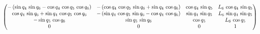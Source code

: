 $$\ifx\endpmatrix\undefined\pmatrix{\else\begin{pmatrix}\fi -\left(
 \sin q_{4}\,\sin q_{6}-\cos q_{4}\,\cos q_{5}\,\cos q_{6}\right)&-
 \left(\cos q_{4}\,\cos q_{5}\,\sin q_{6}+\sin q_{4}\,\cos q_{6}
 \right)&\cos q_{4}\,\sin q_{5}&L_{6}\,\cos q_{4}\,\sin q_{5}\cr 
 \cos q_{4}\,\sin q_{6}+\sin q_{4}\,\cos q_{5}\,\cos q_{6}&-\left(
 \sin q_{4}\,\cos q_{5}\,\sin q_{6}-\cos q_{4}\,\cos q_{6}\right)&
 \sin q_{4}\,\sin q_{5}&L_{6}\,\sin q_{4}\,\sin q_{5}\cr -\sin q_{5}
 \,\cos q_{6}&\sin q_{5}\,\sin q_{6}&\cos q_{5}&L_{6}\,\cos q_{5}\cr 
 0&0&0&1\cr \ifx\endpmatrix\undefined}\else\end{pmatrix}\fi $$

